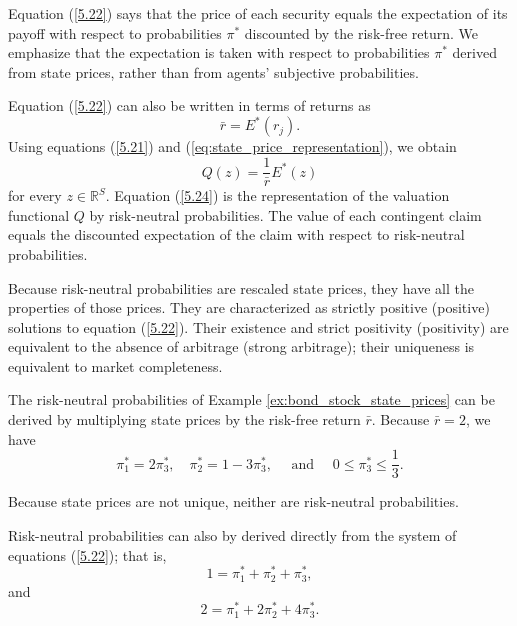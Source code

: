 \documentclass[\topdir/lecture\_notes.tex]{subfiles}
\begin{document}
Equation (\ref{5.22}) says that the price of each security equals the expectation of its payoff with respect to probabilities $\pi^{*}$ discounted by the risk-free return. We emphasize that the expectation is taken with respect to probabilities $\pi^{*}$ derived from state prices, rather than from agents' subjective probabilities.

Equation (\ref{5.22}) can also be written in terms of returns as
\begin{equation*}
\bar{r}=E^{*}(r_{j}) . 
\end{equation*}
Using equations (\ref{5.21}) and (\ref{eq:state_price_representation}), we obtain
\begin{equation}
Q(z)=\frac{1}{\bar{r}} E^{*}(z) \label{5.24}
\end{equation}
for every $z \in \mathbb{R}^{S}$. Equation (\ref{5.24}) is the representation of the valuation functional $Q$ by risk-neutral probabilities. The value of each contingent claim equals the discounted expectation of the claim with respect to risk-neutral probabilities.

Because risk-neutral probabilities are rescaled state prices, they have all the properties of those prices. They are characterized as strictly positive (positive) solutions to equation (\ref{5.22}). Their existence and strict positivity (positivity) are equivalent to the absence of arbitrage (strong arbitrage); their uniqueness is equivalent to market completeness.

\begin{example}\label{ex:risk_neutral_calculation}
The risk-neutral probabilities of Example \ref{ex:bond_stock_state_prices} can be derived by multiplying state prices by the risk-free return $\bar{r}$. Because $\bar{r}=2$, we have
\begin{equation*}
\pi_{1}^{*}=2 \pi_{3}^{*}, \quad \pi_{2}^{*}=1-3 \pi_{3}^{*}, \quad \text { and } \quad 0 \leq \pi_{3}^{*} \leq \frac{1}{3} . 
\end{equation*}

Because state prices are not unique, neither are risk-neutral probabilities.

Risk-neutral probabilities can also by derived directly from the system of equations (\ref{5.22}); that is,
\begin{equation*}
1=\pi_{1}^{*}+\pi_{2}^{*}+\pi_{3}^{*}, 
\end{equation*}
and
\begin{equation*}
2=\pi_{1}^{*}+2 \pi_{2}^{*}+4 \pi_{3}^{*} . 
\end{equation*}
\end{example}
\end{document}
